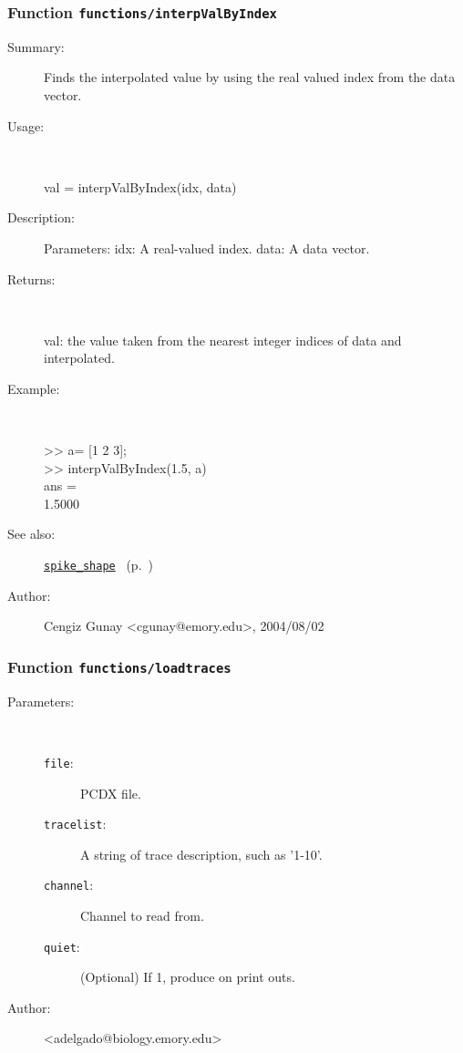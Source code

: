 \subsubsection[Function \texttt{interpValByIndex}]{Function \texttt{functions/interpValByIndex}}%
%
\label{ref_functions__interpValByIndex}%
\hypertarget{ref_functions__interpValByIndex}{}%
\begin{description}
\item[Summary:]Finds the interpolated value by using the real valued index from the data vector.
%
\item[Usage:]~%
\begin{lyxcode}%
val = interpValByIndex(idx, data)
%
\end{lyxcode}%
%
\item[Description:]%
Parameters:
	idx: A real-valued index.
	data: A data vector.
%
\item[Returns:
]~

	val: the value taken from the nearest integer indices of data and interpolated.
%
\item[Example:]~
\begin{lyxcode} >> a= [1 2 3];
\\%
 >> interpValByIndex(1.5, a)
\\%
 ans =
\\%
    1.5000
\\%
\end{lyxcode}
%
\item[See also:]%
\hyperlink{ref_spike_shape}{\texttt{spike\_shape}}%
\ (p.~\pageref{ref_spike_shape})%
%
%
\item[Author:]%
Cengiz Gunay <cgunay@emory.edu>, 2004/08/02
%
\end{description}
\methodline%
\subsubsection[Function \texttt{loadtraces}]{Function \texttt{functions/loadtraces}}%
%
\label{ref_functions__loadtraces}%
\hypertarget{ref_functions__loadtraces}{}%
\begin{description}
%
%
%
\item[Parameters:]~
\begin{description}%
\item[\texttt{file}:]
 PCDX file.
\item[\texttt{tracelist}:]
 A string of trace description, such as '1-10'.
\item[\texttt{channel}:]
 Channel to read from.
\item[\texttt{quiet}:]
 (Optional) If 1, produce on print outs.
\end{description}%
%
%
%
%
\item[Author:]%
<adelgado@biology.emory.edu>
%
\end{description}
\methodline%
